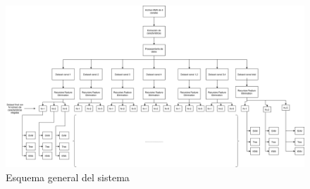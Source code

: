  \begin{figure}[h]
    \includegraphics[height=0.85\textwidth,angle=90]{imagenes/esquema final.png}
    \caption{ Esquema general del sistema }
    \label{fig:esquemageneral}
   \end{figure}
    

